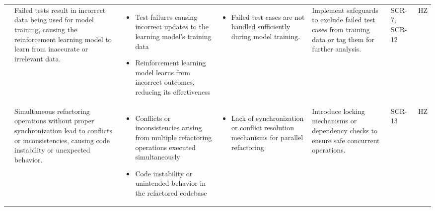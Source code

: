 \documentclass{article}
\newcounter{hazard}
\newcommand{\showmycounter}{\stepcounter{hazard}\thehazard}
\begin{document}
\begin{landscape}
\begin{longtable}{|p{0.6cm}|p{4cm}p{4cm}p{4cm}p{4cm}p{1.5cm}p{1.5cm}|}
    & Failed tests result in incorrect data being used for model training, causing the reinforcement learning model to learn from inaccurate or irrelevant data. & 
    \begin{itemize}[wide=0pt]
        \item Test failures causing incorrect updates to the learning model's training data
        \item Reinforcement learning model learns from incorrect outcomes, reducing its effectiveness
    \end{itemize} &
    \begin{itemize}[wide=0pt]
        \item Failed test cases are not handled sufficiently during model training.
    \end{itemize}
    & Implement safeguards to exclude failed test cases from training data or tag them for further analysis. & SCR-7, SCR-12 & HZ \showmycounter \\ \cline{2-7} 


    & Simultaneous refactoring operations without proper synchronization lead to conflicts or inconsistencies, causing code instability or unexpected behavior. & 
    \begin{itemize}[wide=0pt]
        \item Conflicts or inconsistencies arising from multiple refactoring operations executed simultaneously
        \item Code instability or unintended behavior in the refactored codebase
    \end{itemize} &
    \begin{itemize}[wide=0pt]
        \item Lack of synchronization or conflict resolution mechanisms for parallel refactoring
    \end{itemize}
    & Introduce locking mechanisms or dependency checks to ensure safe concurrent operations. & SCR-13 & HZ \showmycounter \\ \hline


\end{longtable}
\end{landscape}
\end{document}
